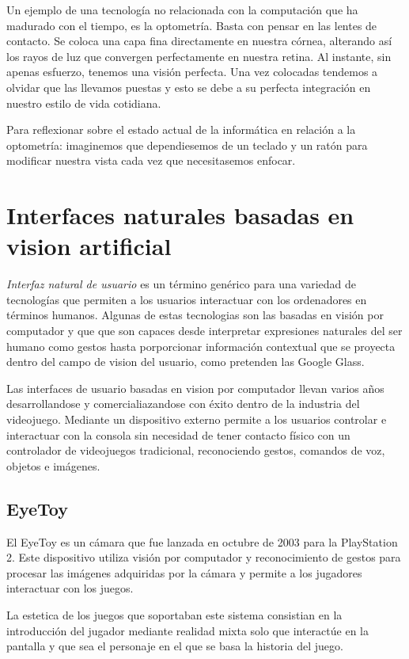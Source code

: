 Un ejemplo de una tecnología no relacionada con la computación que ha madurado con el tiempo, es la optometría. Basta con pensar en las lentes de contacto. Se coloca una capa fina directamente en nuestra córnea, alterando así los rayos de luz que convergen perfectamente en nuestra retina. Al instante, sin apenas esfuerzo, tenemos una visión perfecta. Una vez colocadas tendemos a olvidar que las llevamos puestas y esto se debe a su perfecta integración en nuestro estilo de vida cotidiana. 

Para reflexionar sobre el estado actual de la informática en relación a la optometría: imaginemos que dependiesemos de un teclado y un ratón para modificar nuestra vista cada vez que necesitasemos enfocar.

\section{Interfaces naturales basadas en vision artificial}
\emph{Interfaz natural de usuario} es un término genérico para una variedad de tecnologías que permiten a los usuarios interactuar con los ordenadores en términos humanos. Algunas de estas tecnologias son las basadas en visión por computador y que que son capaces desde interpretar expresiones naturales del ser humano como gestos hasta porporcionar información contextual que se proyecta dentro del campo de vision del usuario, como pretenden las Google Glass. 

Las interfaces de usuario basadas en vision por computador llevan varios años desarrollandose y comercialiazandose con éxito dentro de la industria del videojuego. Mediante un dispositivo externo permite a los usuarios controlar e interactuar con la consola sin necesidad de tener contacto físico con un controlador de videojuegos tradicional, reconociendo gestos, comandos de voz, objetos e imágenes.

\subsection{EyeToy}
El EyeToy es un cámara que fue lanzada en octubre de 2003 para la PlayStation 2. Este dispositivo utiliza visión por computador y reconocimiento de gestos para procesar las imágenes adquiridas por la cámara y permite a los jugadores interactuar con los juegos.

La estetica de los juegos que soportaban este sistema consistian en la introducción del jugador mediante realidad mixta solo que interactúe en la pantalla y que sea el personaje en el que se basa la historia del juego. 

